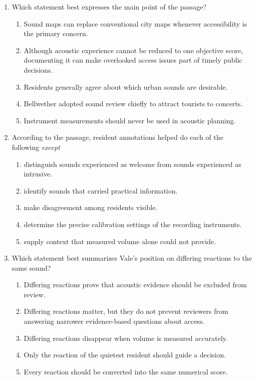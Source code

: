 \begin{enumerate}

\item Which statement best expresses the main point of the passage?
\begin{enumerate}
\item[(A)] Sound maps can replace conventional city maps whenever accessibility is the primary concern.
\item[(B)] Although acoustic experience cannot be reduced to one objective score, documenting it can make overlooked access issues part of timely public decisions.
\item[(C)] Residents generally agree about which urban sounds are desirable.
\item[(D)] Bellwether adopted sound review chiefly to attract tourists to concerts.
\item[(E)] Instrument measurements should never be used in acoustic planning.
\end{enumerate}

\item According to the passage, resident annotations helped do each of the following \emph{except}
\begin{enumerate}
\item[(A)] distinguish sounds experienced as welcome from sounds experienced as intrusive.
\item[(B)] identify sounds that carried practical information.
\item[(C)] make disagreement among residents visible.
\item[(D)] determine the precise calibration settings of the recording instruments.
\item[(E)] supply context that measured volume alone could not provide.
\end{enumerate}

\item Which statement best summarizes Vale's position on differing reactions to the same sound?
\begin{enumerate}
\item[(A)] Differing reactions prove that acoustic evidence should be excluded from review.
\item[(B)] Differing reactions matter, but they do not prevent reviewers from answering narrower evidence-based questions about access.
\item[(C)] Differing reactions disappear when volume is measured accurately.
\item[(D)] Only the reaction of the quietest resident should guide a decision.
\item[(E)] Every reaction should be converted into the same numerical score.
\end{enumerate}


\end{enumerate}

